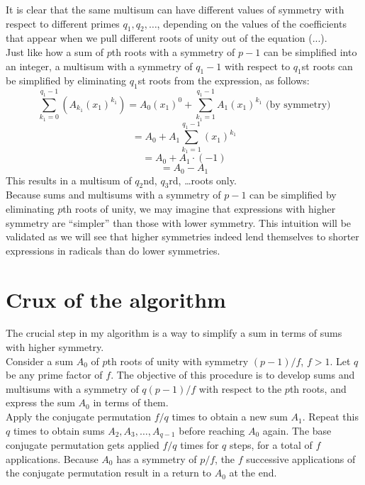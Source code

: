 \documentclass{article}
\begin{document}
	It is clear that the same multisum can have different values of symmetry with respect to different primes $ q_1, q_2, \dots $, depending on the values of the coefficients that appear when we pull different roots of unity out of the equation (...).\\
	Just like how a sum of $ p $th roots with a symmetry of $ p - 1 $ can be simplified into an integer, a multisum with a symmetry of $ q_1 - 1 $ with respect to $ q_1 $st roots can be simplified by eliminating $ q_1 $st roots from the expression, as follows:
    $$ \sum_{k_1 = 0}^{q_1 - 1} (A_{k_1} (x_1)^{k_1}) = A_0 (x_1)^0 + \sum_{k_1 = 1}^{q_1 - 1} A_1 (x_1)^{k_1} \text{ (by symmetry)} $$
    $$ = A_0 + A_1 \sum_{k_1 = 1}^{q_1 - 1} (x_1)^{k_1} $$
    $$ = A_0 + A_1 \cdot (-1) $$
    $$ = A_0 - A_1 $$
    This results in a multisum of $ q_2 $nd, $ q_3 $rd, \dots roots only.\\
	Because sums and multisums with a symmetry of $ p - 1 $ can be simplified by eliminating $ p $th roots of unity, we may imagine that expressions with higher symmetry are ``simpler'' than those with lower symmetry. This intuition will be validated as we will see that higher symmetries indeed lend themselves to shorter expressions in radicals than do lower symmetries.\\
\section{Crux of the algorithm}
	The crucial step in my algorithm is a way to simplify a sum in terms of sums with higher symmetry.\\
	Consider a sum $ A_0 $ of $ p $th roots of unity with symmetry $ (p - 1)/f $, $ f > 1 $. Let $ q $ be any prime factor of $ f $. The objective of this procedure is to develop sums and multisums with a symmetry of $ q(p - 1)/f $ with respect to the $ p $th roots, and express the sum $ A_0 $ in terms of them.\\
	Apply the conjugate permutation $ f/q $ times to obtain a new sum $ A_1 $. Repeat this $ q $ times to obtain sums $ A_2, A_3, \dots, A_{q - 1} $ before reaching $ A_0 $ again. The base conjugate permutation gets applied $ f/q $ times for $ q $ steps, for a total of $ f $ applications. Because $ A_0 $ has a symmetry of $ p/f $, the $ f $ successive applications of the conjugate permutation result in a return to $ A_0 $ at the end.\\
\end{document}
